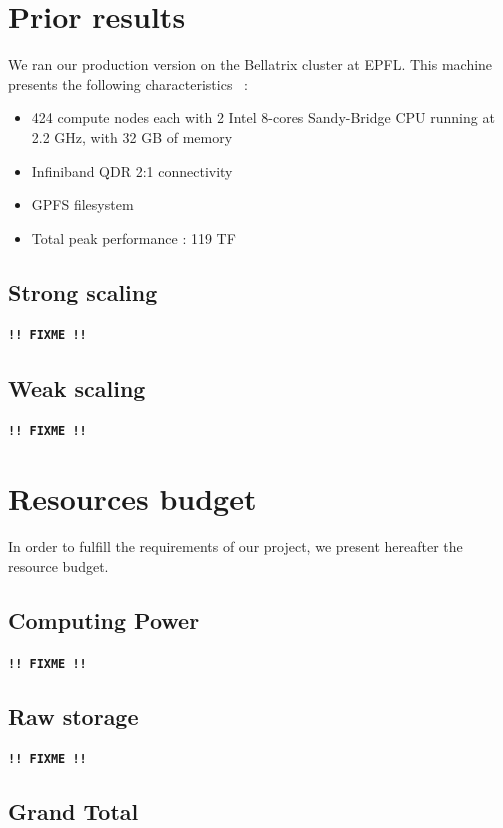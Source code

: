 \documentclass[11pt,a4paper]{article}
\begin{document}
\section{Prior results}

We ran our production version on the Bellatrix cluster at EPFL. This machine presents the following characteristics~\cite{scitas} : 

\begin{itemize}
\item 424 compute nodes each with 2 Intel 8-cores Sandy-Bridge CPU running at
  2.2 GHz, with 32 GB of memory
\item Infiniband QDR 2:1 connectivity
\item GPFS filesystem
\item Total peak performance : 119 TF
\end{itemize}

\subsection{Strong scaling}

\textbf{\texttt{!! FIXME !!}}

\subsection{Weak scaling}

\textbf{\texttt{!! FIXME !!}}


\section{Resources budget}

In order to fulfill the requirements of our project, we present hereafter the resource budget. 

\subsection{Computing Power}

\textbf{\texttt{!! FIXME !!}}

\subsection{Raw storage}

\textbf{\texttt{!! FIXME !!}}

\subsection{Grand Total}
\end{document}
